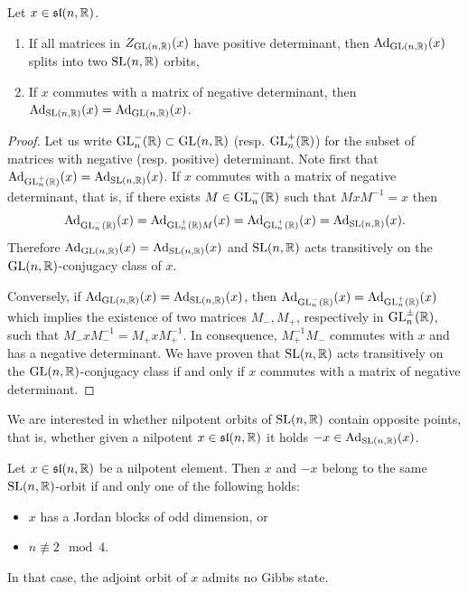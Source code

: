\documentclass[english]{article}
\begin{document}
\begin{lemma}
Let $x\in \mathfrak{sl}(n, \mathbb{R})$.
\begin{enumerate}
    \item If all matrices in $Z_{\operatorname{GL}(n, \mathbb{R})}(x)$ have positive determinant, then $\operatorname{Ad}_{\operatorname{GL}(n, \mathbb{R})}(x)$ splits into two $\operatorname{SL}(n, \mathbb{R})$ orbits,
    \item If $x$ commutes with a matrix of negative determinant, then $\operatorname{Ad}_{\operatorname{SL}(n, \mathbb{R})}(x) = \operatorname{Ad}_{\operatorname{GL}(n, \mathbb{R})}(x)$.
\end{enumerate}
\end{lemma}

\begin{proof}
Let us write $\operatorname{GL}_n^-(\mathbb{R})\subset \operatorname{GL}(n, \mathbb{R})$ (resp. $\operatorname{GL}_n^+(\mathbb{R})$) for the subset of matrices with negative (resp. positive) determinant. Note first that $\operatorname{Ad}_{\operatorname{GL}_n^+(\mathbb{R})}(x) = \operatorname{Ad}_{\operatorname{SL}(n, \mathbb{R})}(x)$. 
If $x$ commutes with a matrix of negative determinant, that is, if there exists $M\in \operatorname{GL}_n^-(\mathbb{R})$ such that $MxM^{-1} = x$ then 
\[
    \operatorname{Ad}_{\operatorname{GL}_n^-(\mathbb{R})}(x)
    = \operatorname{Ad}_{\operatorname{GL}_n^+(\mathbb{R})M}(x)
    = \operatorname{Ad}_{\operatorname{GL}_n^+(\mathbb{R})}(x)
    = \operatorname{Ad}_{\operatorname{SL}(n, \mathbb{R})}(x)
.\]
Therefore $\operatorname{Ad}_{\operatorname{GL}(n, \mathbb{R})}(x) = \operatorname{Ad}_{\operatorname{SL}(n, \mathbb{R})}(x)$ and $\operatorname{SL}(n, \mathbb{R})$ acts transitively on the $\operatorname{GL}(n, \mathbb{R})$-conjugacy class of $x$.

Conversely, if $\operatorname{Ad}_{\operatorname{GL}(n, \mathbb{R})}(x) = \operatorname{Ad}_{\operatorname{SL}(n, \mathbb{R})}(x)$, then $\operatorname{Ad}_{\operatorname{GL}_n^-(\mathbb{R})}(x) = \operatorname{Ad}_{\operatorname{GL}_n^+(\mathbb{R})}(x)$ which implies the existence of two matrices $M_-, M_+$, respectively in $\operatorname{GL}_n^\pm (\mathbb{R})$, such that $M_- x M_-^{-1} = M_+ x M_+^{-1}$. In consequence, $M_+^{-1} M_-$ commutes with $x$ and has a negative determinant.
We have proven that $\operatorname{SL}(n, \mathbb{R})$ acts transitively on the $\operatorname{GL}(n, \mathbb{R})$-conjugacy class if and only if $x$ commutes with a matrix of negative determinant.
\end{proof}

We are interested in whether nilpotent orbits of $\operatorname{SL}(n, \mathbb{R})$ contain opposite points, that is, whether given a nilpotent $x\in \mathfrak{sl}(n, \mathbb{R})$ it holds $-x\in \operatorname{Ad}_{\operatorname{SL}(n, \mathbb{R})}(x)$.

\begin{proposition}
    Let $x\in \mathfrak{sl}(n, \mathbb{R})$ be a nilpotent element.
    Then $x$ and $-x$ belong to the same $\operatorname{SL}(n, \mathbb{R})$-orbit if and only one of the following holds:
    \begin{itemize}
        \item $x$ has a Jordan blocks of odd dimension, or
        \item $n \not\equiv 2 \mod 4$.    
    \end{itemize} 
    In that case, the adjoint orbit of $x$ admits no Gibbs state.
\end{proposition}
\end{document}
